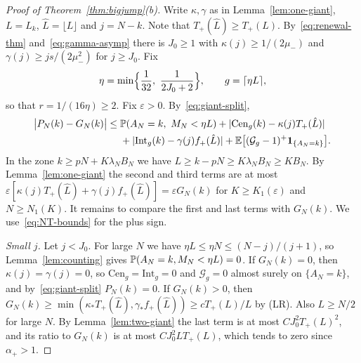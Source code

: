 \begin{proof}[Proof of Theorem~\ref{thm:bigjump}(b)]
Write $\kappa,\gamma$ as in Lemma~\ref{lem:one-giant}, $L=L_k$,
$\hat L=\lfloor L\rfloor$ and $j=N-k$. Note that $T_\plus(\hat L)\ge T_\plus(L)$.
By~\eqref{eq:renewal-thm} and~\eqref{eq:gamma-asymp} there is $J_0\ge1$ with
$\kappa(j)\ge1/(2\mu_\minus)$ and $\gamma(j)\ge js/(2\mu_\minus^2)$ for $j\ge J_0$. Fix
\[
 \eta=\min\Bigl\{\frac1{32},\ \frac1{2J_0+2}\Bigr\},\qquad g=\lceil\eta L\rceil,
\]
so that $r=1/(16\eta)\ge2$. Fix $\varepsilon>0$. By~\eqref{eq:giant-split},
\begin{align*}
 \bigl|P_N(k)-G_N(k)\bigr|\le{}&\mathbb{P}(A_N=k,\ M_N<\eta L)+|\mathrm{Cen}_g(k)-\kappa(j)T_{+}(\hat L)|\\
 &+|\mathrm{Int}_g(k)-\gamma(j)f_{+}(\hat L)|+\mathbb{E}\bigl[(\mathcal G_g-1)^+\mathbf{1}_{\{A_N=k\}}\bigr].
\end{align*}
In the zone $k\ge pN+K\lambda_NB_N$ we have $L\ge k-pN\ge K\lambda_NB_N\ge KB_N$. By
Lemma~\ref{lem:one-giant} the second and third terms are at most
$\varepsilon[\kappa(j)T_\plus(\hat L)+\gamma(j)f_\plus(\hat L)]=\varepsilon G_N(k)$ for
$K\ge K_1(\varepsilon)$ and $N\ge N_1(K)$. It remains to compare the first and last
terms with $G_N(k)$. We use~\eqref{eq:NT-bounds} for the plus sign.

\emph{Small $j$.} Let $j<J_0$. For large $N$ we have
$\eta L\le\eta N\le(N-j)/(j+1)$, so Lemma~\ref{lem:counting} gives
$\mathbb{P}(A_N=k,M_N<\eta L)=0$. If $G_N(k)=0$, then $\kappa(j)=\gamma(j)=0$, so
$\mathrm{Cen}_g=\mathrm{Int}_g=0$ and $\mathcal G_g=0$ almost surely on $\{A_N=k\}$, and
by~\eqref{eq:giant-split} $P_N(k)=0$. If $G_N(k)>0$, then
$G_N(k)\ge\min(\kappa_*T_\plus(\hat L),\gamma_*f_\plus(\hat L))\ge cT_\plus(L)/L$
by (LR). Also $L\ge N/2$ for large $N$. By Lemma~\ref{lem:two-giant} the last term is
at most $CJ_0^2T_\plus(L)^2$, and its ratio to $G_N(k)$ is at most
$CJ_0^2LT_\plus(L)$, which tends to zero since $\alpha_\plus>1$.


\end{proof}
